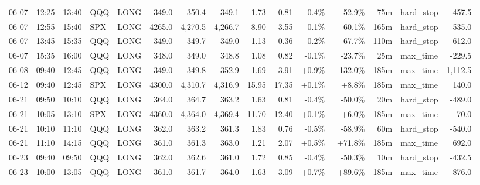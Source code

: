 \documentclass[11pt,a4paper,twoside]{article}
\begin{document}
\begin{landscape}
\begin{center}
\begin{longtable}{>{\color{txtmain}}l l l l l r r r r r r r r >{\color{txtmain}}l r}
06-07 & 12:25 & 13:40 & QQQ & LONG & 349.0 & 350.4 & 349.1 & 1.73 & 0.81 & \textcolor{lossred}{-0.4\%} & \textcolor{lossred}{-52.9\%} & 75m & hard\_stop & \textcolor{lossred}{-457.5} \\
06-07 & 12:55 & 15:40 & SPX & LONG & 4265.0 & 4,270.5 & 4,266.7 & 8.90 & 3.55 & \textcolor{lossred}{-0.1\%} & \textcolor{lossred}{-60.1\%} & 165m & hard\_stop & \textcolor{lossred}{-535.0} \\
06-07 & 13:45 & 15:35 & QQQ & LONG & 349.0 & 349.7 & 349.0 & 1.13 & 0.36 & \textcolor{lossred}{-0.2\%} & \textcolor{lossred}{-67.7\%} & 110m & hard\_stop & \textcolor{lossred}{-612.0} \\
06-07 & 15:35 & 16:00 & QQQ & LONG & 348.0 & 349.0 & 348.8 & 1.08 & 0.82 & \textcolor{lossred}{-0.1\%} & \textcolor{lossred}{-23.7\%} & 25m & max\_time & \textcolor{lossred}{-229.5} \\
06-08 & 09:40 & 12:45 & QQQ & LONG & 349.0 & 349.8 & 352.9 & 1.69 & 3.91 & \textcolor{wingreen}{+0.9\%} & \textcolor{wingreen}{+132.0\%} & 185m & max\_time & \textcolor{wingreen}{1,112.5} \\
06-12 & 09:40 & 12:45 & SPX & LONG & 4300.0 & 4,310.7 & 4,316.9 & 15.95 & 17.35 & \textcolor{wingreen}{+0.1\%} & \textcolor{wingreen}{+8.8\%} & 185m & max\_time & \textcolor{wingreen}{140.0} \\
06-21 & 09:50 & 10:10 & QQQ & LONG & 364.0 & 364.7 & 363.2 & 1.63 & 0.81 & \textcolor{lossred}{-0.4\%} & \textcolor{lossred}{-50.0\%} & 20m & hard\_stop & \textcolor{lossred}{-489.0} \\
06-21 & 10:05 & 13:10 & SPX & LONG & 4360.0 & 4,364.0 & 4,369.4 & 11.70 & 12.40 & \textcolor{wingreen}{+0.1\%} & \textcolor{wingreen}{+6.0\%} & 185m & max\_time & \textcolor{wingreen}{70.0} \\
06-21 & 10:10 & 11:10 & QQQ & LONG & 362.0 & 363.2 & 361.3 & 1.83 & 0.76 & \textcolor{lossred}{-0.5\%} & \textcolor{lossred}{-58.9\%} & 60m & hard\_stop & \textcolor{lossred}{-540.0} \\
06-21 & 11:10 & 14:15 & QQQ & LONG & 361.0 & 361.3 & 363.0 & 1.21 & 2.07 & \textcolor{wingreen}{+0.5\%} & \textcolor{wingreen}{+71.8\%} & 185m & max\_time & \textcolor{wingreen}{692.0} \\
06-23 & 09:40 & 09:50 & QQQ & LONG & 362.0 & 362.6 & 361.0 & 1.72 & 0.85 & \textcolor{lossred}{-0.4\%} & \textcolor{lossred}{-50.3\%} & 10m & hard\_stop & \textcolor{lossred}{-432.5} \\
06-23 & 10:00 & 13:05 & QQQ & LONG & 361.0 & 361.7 & 364.0 & 1.63 & 3.09 & \textcolor{wingreen}{+0.7\%} & \textcolor{wingreen}{+89.6\%} & 185m & max\_time & \textcolor{wingreen}{876.0} \\

\end{longtable}
\end{center}
\end{landscape}
\end{document}
